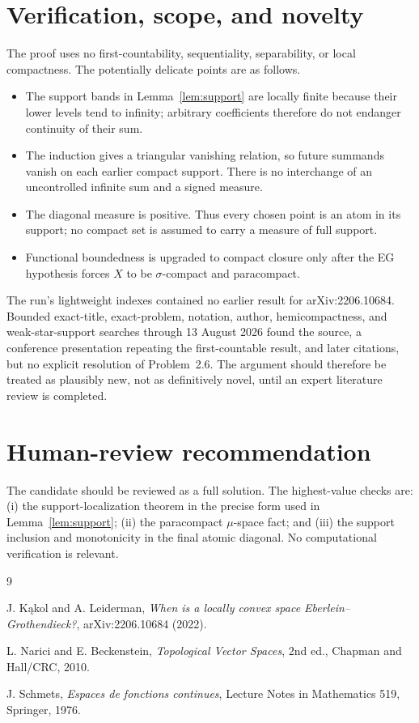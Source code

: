 \documentclass[11pt]{article}
\begin{document}
\section{Verification, scope, and novelty}

The proof uses no first-countability, sequentiality, separability, or local
compactness.  The potentially delicate points are as follows.

\begin{itemize}
\item The support bands in Lemma~\ref{lem:support} are locally finite because
their lower levels tend to infinity; arbitrary coefficients therefore do not
endanger continuity of their sum.
\item The induction gives a triangular vanishing relation, so future
summands vanish on each earlier compact support.  There is no interchange of
an uncontrolled infinite sum and a signed measure.
\item The diagonal measure is positive.  Thus every chosen point is an atom
in its support; no compact set is assumed to carry a measure of full support.
\item Functional boundedness is upgraded to compact closure only after the EG
hypothesis forces $X$ to be $\sigma$-compact and paracompact.
\end{itemize}

The run's lightweight indexes contained no earlier result for arXiv:2206.10684.
Bounded exact-title, exact-problem, notation, author, hemicompactness, and
weak-star-support searches through 13 August 2026 found the source, a
conference presentation repeating the first-countable result, and later
citations, but no explicit resolution of Problem~2.6.  The argument should
therefore be treated as plausibly new, not as definitively novel, until an
expert literature review is completed.

\section{Human-review recommendation}

The candidate should be reviewed as a full solution.  The highest-value checks
are: (i) the support-localization theorem in the precise form used in
Lemma~\ref{lem:support}; (ii) the paracompact $\mu$-space fact; and (iii) the
support inclusion and monotonicity in the final atomic diagonal.  No
computational verification is relevant.

\begin{thebibliography}{9}
\raggedright

J. K\k{a}kol and A. Leiderman,
\emph{When is a locally convex space Eberlein--Grothendieck?},
arXiv:2206.10684 (2022).

L. Narici and E. Beckenstein,
\emph{Topological Vector Spaces}, 2nd ed., Chapman and Hall/CRC, 2010.

J. Schmets,
\emph{Espaces de fonctions continues},
Lecture Notes in Mathematics 519, Springer, 1976.

\end{thebibliography}
\end{document}

